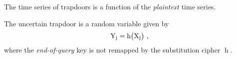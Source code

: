 \documentclass[ ../main.tex]{subfiles}
\begin{document}
The time series of trapdoors is a function of the \emph{plaintext} time series.
\begin{definition}
The uncertain \jth trapdoor is a random variable given by
\begin{equation}
    \mathrm{Y_j} = \operatorname{h}\!\left(\mathrm{X_j}\right)\,,
\end{equation}
where the \emph{end-of-query} key is not remapped by the substitution cipher $\operatorname{h}$.
\end{definition}
\end{document}
